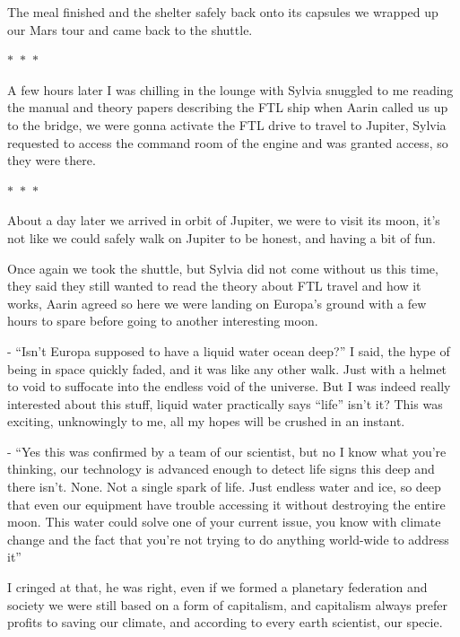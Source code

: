 \documentclass[hidelinks,12pt,a4paper]{book}
\newcommand\sep{\begin{center}
  \boldmath $\ast$~$\ast$~$\ast$
\end{center}}
\begin{document}
The meal finished and the shelter safely back onto its capsules we wrapped up our Mars tour and came back to the shuttle.

\sep

A few hours later I was chilling in the lounge with Sylvia snuggled to me reading the manual and theory papers 
describing the FTL ship when Aarin called us up to the bridge, we were gonna activate the FTL drive to travel to Jupiter, 
Sylvia requested to access the command room of the engine and was granted access, so they were there.

\sep

About a day later we arrived in orbit of Jupiter, we were to visit its moon, it's not like we could 
safely walk on Jupiter to be honest, and having a bit of fun.\par
\bigskip

Once again we took the shuttle, but Sylvia did not come without us this time, they said they still wanted to read the 
theory about FTL travel and how it works, Aarin agreed so here we were landing on Europa's ground with a few hours to 
spare before going to another interesting moon.\par
\bigskip


- “Isn't Europa supposed to have a liquid water ocean deep?” I said, the hype of being in space quickly faded, and it was 
like any other walk. Just with a helmet to void to suffocate into the endless void of the universe. 
But I was indeed really interested about this stuff, liquid water practically says “life” isn't it? This was exciting,
 unknowingly to me, all my hopes will be crushed in an instant.\par
 \bigskip

- “Yes this was confirmed by a team of our scientist, but no I know what you're thinking, our technology is advanced 
enough to detect life signs this deep and there isn't. None. Not a single spark of life. Just endless water and ice, 
so deep that even our equipment have trouble accessing it without destroying the entire moon. This water could 
solve one of your current issue, you know with climate change and the fact that you're not trying to do anything 
world-wide to address it”\par
\bigskip

I cringed at that, he was right, even if we formed a planetary federation and society we were still based on a form of 
capitalism, and capitalism always prefer profits to saving our climate, and according to every earth scientist, our specie.\par
\bigskip
\end{document}
